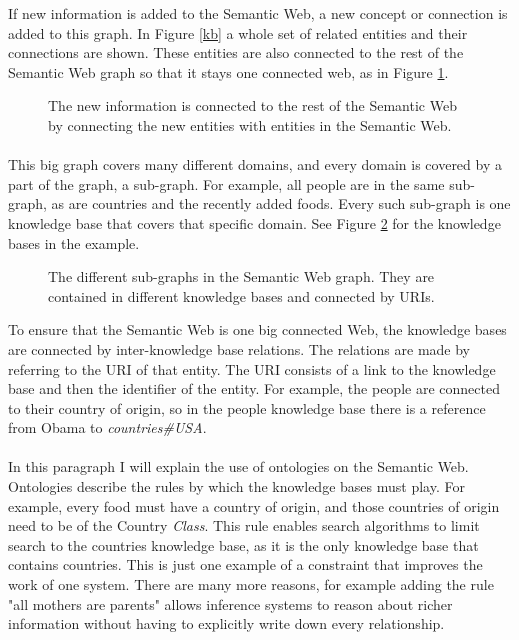 \documentclass{article}
\begin{document}
 If new information is added to the Semantic Web, a new concept or connection is added to this graph. In Figure \ref{kb} a whole set of related entities and their connections are shown. These entities are also connected to the rest of the Semantic Web graph so that it stays one connected web, as in Figure \ref{combine}.
 
 \begin{figure}[H]
 \centering
 \caption[Linking the knowledge base]{The new information is connected to the rest of the Semantic Web by connecting the new entities with entities in the Semantic Web.}
 \label{combine}
 \end{figure}
 
 \paragraph{}
 This big graph covers many different domains, and every domain is covered by a part of the graph, a sub-graph. For example, all people are in the same sub-graph, as are countries and the recently added foods. Every such sub-graph is one knowledge base that covers that specific domain. See Figure \ref{kbs} for the knowledge bases in the example.
 
 \begin{figure}[H]
 \centering
 \caption[Semantic Web knowledge base view]{The different sub-graphs in the Semantic Web graph. They are contained in different knowledge bases and connected by URIs.}
 \label{kbs}
 \end{figure}
 
 To ensure that the Semantic Web is one big connected Web, the knowledge bases are connected by inter-knowledge base relations. The relations are made by referring to the URI of that entity. The URI consists of a link to the knowledge base and then the identifier of the entity. For example, the people are connected to their country of origin, so in the people knowledge base there is a reference from Obama to \emph{countries\#USA}.
 \paragraph{}
 In this paragraph I will explain the use of ontologies on the Semantic Web. Ontologies describe the rules by which the knowledge bases must play. For example, every food must have a country of origin, and those countries of origin need to be of the Country \emph{Class}. This rule enables search algorithms to limit search to the countries knowledge base, as it is the only knowledge base that contains countries\cite{whyontologies}. This is just one example of a constraint that improves the work of one system. There are many more reasons, for example adding the rule "all mothers are parents" allows inference systems to reason about richer information without having to explicitly write down every relationship.
 
\end{document}
